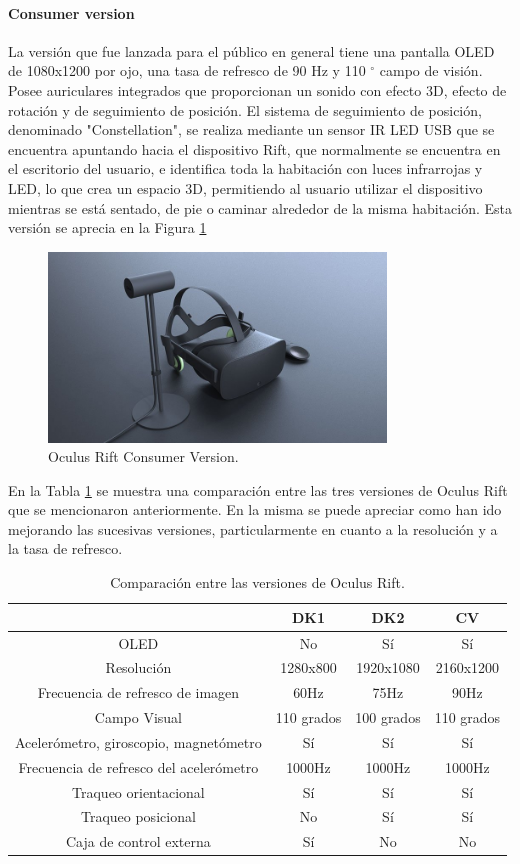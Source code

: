\documentclass[12pt]{article}
\begin{document}
\paragraph{Consumer version}
La versión que fue lanzada para el público en general tiene una pantalla OLED de 1080x1200 por ojo, una tasa de refresco de 90 Hz y 110 $^{\circ}$ campo de visión. Posee auriculares integrados que proporcionan un sonido con efecto 3D, efecto de rotación y de seguimiento de posición. El sistema de seguimiento de posición, denominado "Constellation", se realiza mediante un sensor IR LED USB que se encuentra apuntando hacia el dispositivo Rift, que normalmente se encuentra en el escritorio del usuario, e identifica toda la habitación con luces infrarrojas y LED, lo que crea un espacio 3D, permitiendo al usuario utilizar el dispositivo mientras se está sentado, de pie o caminar alrededor de la misma habitación. Esta versión se aprecia en la Figura \ref{cv}
\clearpage
\begin{figure}[h!]
\includegraphics[width=0.8\textwidth,center]{cv.jpg}
\caption{Oculus Rift Consumer Version.}
\label{cv}
\end{figure}

En la Tabla \ref{tablaOR} se muestra una comparación entre las tres versiones de Oculus Rift que se mencionaron anteriormente. En la misma se puede apreciar como han ido mejorando las sucesivas versiones, particularmente en cuanto a la resolución y a la tasa de refresco.
\begin{table}[h!]
  \centering
  \begin{tabular}{cccc}
    \toprule
     & DK1 & DK2 & CV\\
    \midrule
    OLED & No & Sí & Sí\\
    Resolución & 1280x800 & 1920x1080 & 2160x1200 \\
    Frecuencia de refresco de imagen & 60Hz & 75Hz & 90Hz\\
    Campo Visual & 110 grados & 100 grados & 110 grados\\
    Acelerómetro, giroscopio, magnetómetro & Sí & Sí & Sí\\  
    Frecuencia de refresco del acelerómetro & 1000Hz& 1000Hz & 1000Hz\\
    Traqueo orientacional & Sí & Sí & Sí\\ 
    Traqueo posicional & No & Sí & Sí\\
    Caja de control externa & Sí & No & No\\
    \bottomrule
  \end{tabular}
  \caption{Comparación entre las versiones de Oculus Rift.}
\label{tablaOR}
\end{table}
\clearpage
\end{document}
